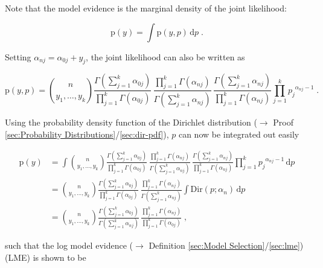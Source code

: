 \documentclass[a4paper,12pt,twoside]{book}
\begin{document}
Note that the model evidence is the marginal density of the joint likelihood:

\begin{equation} \label{eq:mult-lme-Mult-ME-s1}
\mathrm{p}(y) = \int \mathrm{p}(y,p) \, \mathrm{d}p \; .
\end{equation}

Setting $\alpha_{nj} = \alpha_{0j} + y_j$, the joint likelihood can also be written as

\begin{equation} \label{eq:mult-lme-Mult-JL-s2}
\mathrm{p}(y,p) = {n \choose {y_1, \ldots, y_k}} \frac{\Gamma \left( \sum_{j=1}^{k} \alpha_{0j} \right)}{\prod_{j=1}^k \Gamma(\alpha_{0j})} \, \frac{\prod_{j=1}^k \Gamma(\alpha_{nj})} {\Gamma \left( \sum_{j=1}^{k} \alpha_{nj} \right)} \, \frac{\Gamma \left( \sum_{j=1}^{k} \alpha_{nj} \right)}{\prod_{j=1}^k \Gamma(\alpha_{nj})} \prod_{j=1}^{k} {p_j}^{\alpha_{nj}-1} \; .
\end{equation}

Using the probability density function of the Dirichlet distribution ($\rightarrow$ Proof \ref{sec:Probability Distributions}/\ref{sec:dir-pdf}), $p$ can now be integrated out easily

\begin{equation} \label{eq:mult-lme-Mult-ME-s2}
\begin{split}
\mathrm{p}(y) &= \int {n \choose {y_1, \ldots, y_k}} \frac{\Gamma \left( \sum_{j=1}^{k} \alpha_{0j} \right)}{\prod_{j=1}^k \Gamma(\alpha_{0j})} \, \frac{\prod_{j=1}^k \Gamma(\alpha_{nj})}{\Gamma \left( \sum_{j=1}^{k} \alpha_{nj} \right)} \, \frac{\Gamma \left( \sum_{j=1}^{k} \alpha_{nj} \right)}{\prod_{j=1}^k \Gamma(\alpha_{nj})} \prod_{j=1}^{k} {p_j}^{\alpha_{nj}-1} \, \mathrm{d}p \\
&= {n \choose {y_1, \ldots, y_k}} \frac{\Gamma \left( \sum_{j=1}^{k} \alpha_{0j} \right)}{\prod_{j=1}^k \Gamma(\alpha_{0j})} \, \frac{\prod_{j=1}^k \Gamma(\alpha_{nj})}{\Gamma \left( \sum_{j=1}^{k} \alpha_{nj} \right)} \int \mathrm{Dir}(p; \alpha_n) \, \mathrm{d}p \\
&= {n \choose {y_1, \ldots, y_k}} \frac{\Gamma \left( \sum_{j=1}^{k} \alpha_{0j} \right)}{\Gamma \left( \sum_{j=1}^{k} \alpha_{nj} \right)} \, \frac{\prod_{j=1}^k \Gamma(\alpha_{nj})}{\prod_{j=1}^k \Gamma(\alpha_{0j})} \; ,
\end{split}
\end{equation}

such that the log model evidence ($\rightarrow$ Definition \ref{sec:Model Selection}/\ref{sec:lme}) (LME) is shown to be
\end{document}
